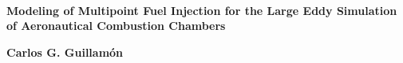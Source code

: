 \setlength{\unitlength}{1 cm} %
\thispagestyle{empty}




~ ~

\vspace{5.5cm}
  
\begin{center}

\Huge \textbf{Modeling of Multipoint Fuel Injection for the Large Eddy Simulation of Aeronautical Combustion Chambers}



\vspace{10.5cm}

{\LARGE \textbf{Carlos G. Guillam\'on}}\\[1cm]
\end{center}





